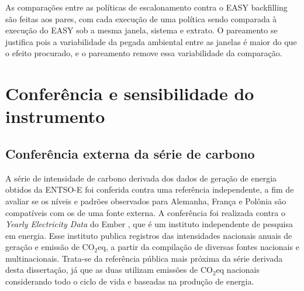 As comparações entre as políticas de escalonamento contra o EASY backfilling são feitas aos pares, com cada execução de uma
política sendo comparada à execução do EASY sob a mesma janela, sistema e extrato. O pareamento se justifica pois
a variabilidade da pegada ambiental entre as janelas é maior do que o efeito procurado, e o pareamento remove essa
variabilidade da comparação. 

\section{Conferência e sensibilidade do instrumento}
\label{sec:conferencia-instrumento}
\subsection{Conferência externa da série de carbono}
\label{subsec:conferencia-externa-carbono}
A série de intensidade de carbono derivada dos dados de geração de energia obtidos da ENTSO-E foi conferida contra
uma referência independente, a fim de avaliar se os níveis e padrões observados para Alemanha, França e Polônia
são compatíveis com os de uma fonte externa. A conferência foi realizada contra o \textit{Yearly Electricity Data} do Ember \citep{ember-yearly}, que é 
um instituto independente de pesquisa em energia. Esse instituto publica registros das intensidades nacionais anuais
de geração e emissão de $\mathrm{CO_{2}eq}$, a partir da compilação de diversas fontes nacionais e multinacionais. Trata-se da 
referência pública mais próxima da série derivada desta dissertação, já que as duas
utilizam emissões de $\mathrm{CO_{2}eq}$ nacionais considerando todo o ciclo de vida e baseadas na produção de energia. 


